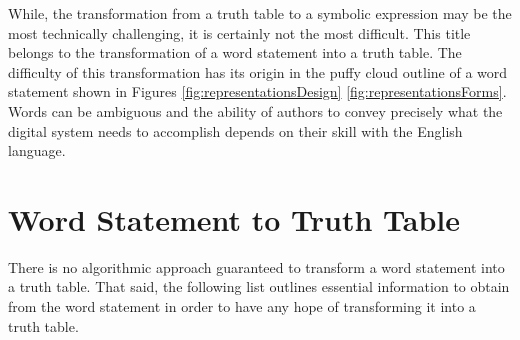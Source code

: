 While, the transformation from a truth table to a symbolic expression
may be the most technically challenging, it is certainly not the
most difficult.  This title belongs to the transformation of a word
statement into a truth table.  The difficulty of this transformation
has its origin in the puffy cloud outline of a word statement shown in
Figures \ref{fig:representationsDesign}  \ref{fig:representationsForms}. Words can be ambiguous and
the ability of authors to convey precisely what the digital system
needs to accomplish depends on their skill with the English language.

\section{Word Statement to Truth Table}
There is no algorithmic approach guaranteed to transform a word statement
into a truth table.  That said, the following list outlines essential
information to obtain from the word statement in order to
have any hope of transforming it into a truth table.

